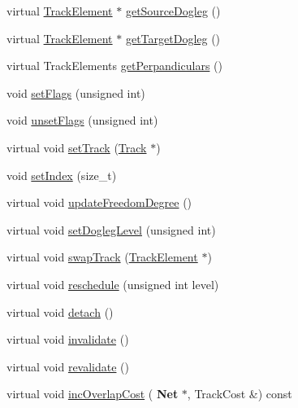 \begin{DoxyCompactItemize}
\item 
virtual \hyperlink{classKite_1_1TrackElement}{Track\+Element} $\ast$ \hyperlink{classKite_1_1TrackElement_a7e79fbfe77f173d46b1959c41087930a}{get\+Source\+Dogleg} ()
\item 
virtual \hyperlink{classKite_1_1TrackElement}{Track\+Element} $\ast$ \hyperlink{classKite_1_1TrackElement_aeb4e39bd925d093e6c45599433bb421c}{get\+Target\+Dogleg} ()
\item 
virtual Track\+Elements \hyperlink{classKite_1_1TrackElement_aa0ba92ebf19f596537dc051c090d5736}{get\+Perpandiculars} ()
\item 
void \hyperlink{classKite_1_1TrackElement_aeb14f94914af58657a0dc2f50ec98df5}{set\+Flags} (unsigned int)
\item 
void \hyperlink{classKite_1_1TrackElement_a1a6fac115cb81db48e3ac9ffa0721bb5}{unset\+Flags} (unsigned int)
\item 
virtual void \hyperlink{classKite_1_1TrackElement_abd3d8093f871d3d1a7f24b053648026c}{set\+Track} (\hyperlink{classKite_1_1Track}{Track} $\ast$)
\item 
void \hyperlink{classKite_1_1TrackElement_abee236b4d62f51320212f31e010fc1b5}{set\+Index} (size\+\_\+t)
\item 
virtual void \hyperlink{classKite_1_1TrackElement_af5332d647c0482aa90ad7cc9b2a50f3a}{update\+Freedom\+Degree} ()
\item 
virtual void \hyperlink{classKite_1_1TrackElement_a2b90319cb042b283aa5d1fdb1992f11f}{set\+Dogleg\+Level} (unsigned int)
\item 
virtual void \hyperlink{classKite_1_1TrackElement_acc245ce084989d1c34816d0e61b9d510}{swap\+Track} (\hyperlink{classKite_1_1TrackElement}{Track\+Element} $\ast$)
\item 
virtual void \hyperlink{classKite_1_1TrackElement_a0ffe603ec7d46f21f5e56ccbe84c03fb}{reschedule} (unsigned int level)
\item 
virtual void \hyperlink{classKite_1_1TrackElement_ac295bade8aee589f6718dfa79edc2a34}{detach} ()
\item 
virtual void \hyperlink{classKite_1_1TrackElement_a893f1101c650c08c98612515c2b1a89c}{invalidate} ()
\item 
virtual void \hyperlink{classKite_1_1TrackElement_a5bd93abe1416952ace15a98dbeeed124}{revalidate} ()
\item 
virtual void \hyperlink{classKite_1_1TrackElement_a7f1126d43df68dd4edbb8d047a134edb}{inc\+Overlap\+Cost} (\textbf{ Net} $\ast$, Track\+Cost \&) const
\item 

\end{DoxyCompactItemize}
